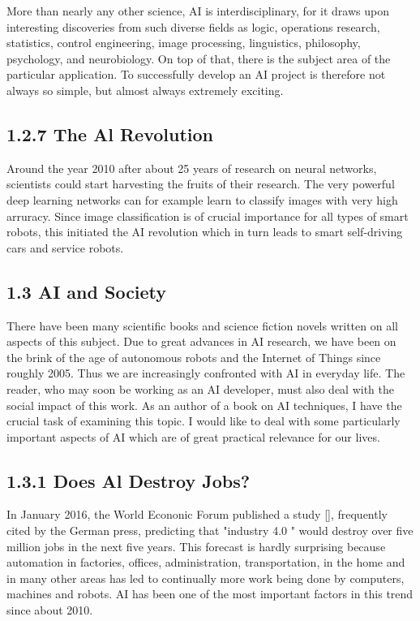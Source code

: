 \documentclass[10pt]{article}
\begin{document}
More than nearly any other science, AI is interdisciplinary, for it draws upon interesting discoveries from such diverse fields as logic, operations research, statistics, control engineering, image processing, linguistics, philosophy, psychology, and neurobiology. On top of that, there is the subject area of the particular application. To successfully develop an AI project is therefore not always so simple, but almost always extremely exciting.

\subsection*{1.2.7 The Al Revolution}
Around the year 2010 after about 25 years of research on neural networks, scientists could start harvesting the fruits of their research. The very powerful deep learning networks can for example learn to classify images with very high arruracy. Since image classification is of crucial importance for all types of smart robots, this initiated the AI revolution which in turn leads to smart self-driving cars and service robots.

\subsection*{1.3 AI and Society}
There have been many scientific books and science fiction novels written on all aspects of this subject. Due to great advances in AI research, we have been on the brink of the age of autonomous robots and the Internet of Things since roughly 2005. Thus we are increasingly confronted with AI in everyday life. The reader, who may soon be working as an AI developer, must also deal with the social impact of this work. As an author of a book on AI techniques, I have the crucial task of examining this topic. I would like to deal with some particularly important aspects of AI which are of great practical relevance for our lives.

\subsection*{1.3.1 Does Al Destroy Jobs?}
In January 2016, the World Econonic Forum published a study [\cite{schwab2016future}], frequently cited by the German press, predicting that "industry 4.0 " would destroy over five\\
million jobs in the next five years. This forecast is hardly surprising because automation in factories, offices, administration, transportation, in the home and in many other areas has led to continually more work being done by computers, machines and robots. AI has been one of the most important factors in this trend since about 2010.
\end{document}
